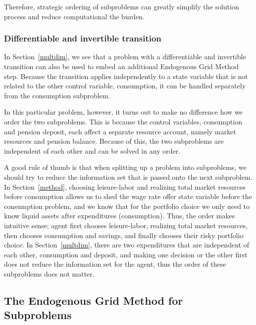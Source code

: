\documentclass{article}
\begin{document}
Therefore, strategic ordering of subproblems can greatly simplify the solution process and reduce computational the burden.

\subsubsection{Differentiable and invertible transition}\label{Differentiable and invertible transition}

In Section~\ref{multdim}, we see that a problem with a differentiable and invertible transition can also be used to embed an additional Endogenous Grid Method step. Because the transition applies independently to a state variable that is not related to the other control variable, consumption, it can be handled separately from the consumption subproblem.


In this particular problem, however, it turns out to make no difference how we order the two subproblems. This is because the control variables, consumption and pension deposit, each affect a separate resource account, namely market resources and pension balance. Because of this, the two subproblems are independent of each other and can be solved in any order.

A good rule of thumb is that when splitting up a problem into subproblems, we should try to reduce the information set that is passed onto the next subproblem. In Section~\ref{method}, choosing leisure-labor and realizing total market resources before consumption allows us to shed the wage rate offer state variable before the consumption problem, and we know that for the portfolio choice we only need to know liquid assets after expenditures (consumption). Thus, the order makes intuitive sense; agent first chooses leisure-labor, realizing total market resources, then chooses consumption and savings, and finally chooses their risky portfolio choice. In Section~\ref{multdim}, there are two expenditures that are independent of each other, consumption and deposit, and making one decision or the other first does not reduce the information set for the agent, thus the order of these subproblems does not matter.

\subsection{The Endogenous Grid Method for Subproblems}\label{The Endogenous Grid Method for Subproblems}
\end{document}
